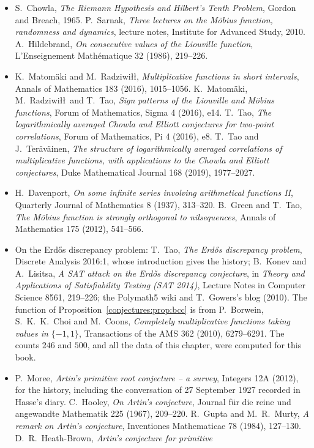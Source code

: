 \begin{itemize}
\item S.~Chowla, \emph{The Riemann Hypothesis and Hilbert's Tenth Problem}, Gordon and Breach, 1965. P.~Sarnak, \emph{Three lectures on the M\"obius
function, randomness and dynamics}, lecture notes, Institute for Advanced Study, 2010. A.~Hildebrand, \emph{On consecutive values of the Liouville function},
L'Enseignement Math\'ematique 32 (1986), 219--226.
\item K.~Matom\"aki and M.~Radziwi\l\l, \emph{Multiplicative functions in short intervals}, Annals of Mathematics 183 (2016), 1015--1056. K.~Matom\"aki,
M.~Radziwi\l\l\ and T.~Tao, \emph{Sign patterns of the Liouville and M\"obius functions}, Forum of Mathematics, Sigma 4 (2016), e14. T.~Tao, \emph{The
logarithmically averaged Chowla and Elliott conjectures for two-point correlations}, Forum of Mathematics, Pi 4 (2016), e8. T.~Tao and J.~Ter\"av\"ainen,
\emph{The structure of logarithmically averaged correlations of multiplicative functions, with applications to the Chowla and Elliott conjectures}, Duke
Mathematical Journal 168 (2019), 1977--2027.
\item H.~Davenport, \emph{On some infinite series involving arithmetical functions II}, Quarterly Journal of Mathematics 8 (1937), 313--320. B.~Green and
T.~Tao, \emph{The M\"obius function is strongly orthogonal to nilsequences}, Annals of Mathematics 175 (2012), 541--566.
\item On the Erd\H os discrepancy problem: T.~Tao, \emph{The Erd\H os discrepancy problem}, Discrete Analysis 2016:1, whose introduction gives the history;
B.~Konev and A.~Lisitsa, \emph{A SAT attack on the Erd\H os discrepancy conjecture}, in \emph{Theory and Applications of Satisfiability Testing (SAT 2014)},
Lecture Notes in Computer Science 8561, 219--226; the Polymath5 wiki and T.~Gowers's blog (2010). The function of Proposition~\ref{conjectures:prop:bcc} is from
P.~Borwein, S.~K.~K.~Choi and M.~Coons, \emph{Completely multiplicative functions taking values in $\{-1,1\}$}, Transactions of the AMS 362 (2010),
6279--6291. The counts $246$ and $500$, and all the data of this chapter, were computed for this book.
\item P.~Moree, \emph{Artin's primitive root conjecture -- a survey}, Integers 12A (2012), for the history, including the conversation of 27 September 1927
recorded in Hasse's diary. C.~Hooley, \emph{On Artin's conjecture}, Journal f\"ur die reine und angewandte Mathematik 225 (1967), 209--220. R.~Gupta and
M.~R.~Murty, \emph{A remark on Artin's conjecture}, Inventiones Mathematicae 78 (1984), 127--130. D.~R.~Heath-Brown, \emph{Artin's conjecture for primitive
}
\end{itemize}
